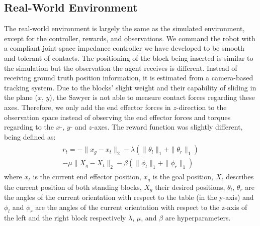 \subsection{Real-World Environment}
The real-world environment is largely the same as the simulated environment, except for the controller, rewards, and observations.
We command the robot with a compliant joint-space impedance controller we have developed to be smooth and tolerant of contacts.
The positioning of the block being inserted is similar to the simulation but the observation the agent receives is different. Instead of receiving ground truth position information, it is estimated from a camera-based tracking system.
Due to the blocks' slight weight and their capability of sliding in the plane ($x$, $y$), the Sawyer is not able to measure contact forces regarding these axes.
Therefore, we only add the end effector forces in $z$-direction to the observation space instead of observing the end effector forces and torques regarding to the $x$-, $y$- and $z$-axes.
The reward function was slightly different, being defined as: 
    \begin{align}
    \begin{split}
    r_t = - \|x_g - x_t \|_2 - \lambda (\|\theta_{l} \|_1 + \|\theta_{r} \|_1) \\ - \mu \|X_g - X_t \|_2 - \beta (\|\phi_{l} \|_1 + \|\phi_{r} \|_1)
    \end{split}
    \end{align}
where $x_t$ is the current end effector position, $x_g$ is the goal position, $X_t$ describes the current position of both standing blocks, $X_g$ their desired positions, $\theta_{l}$, $\theta_{r}$ are the angles of the current orientation with respect to the table (in the y-axis) and $\phi_{l}$ and $\phi_{r}$ are the angles of the current orientation with respect to the z-axis of the left and the right block respectively $\lambda$, $\mu$, and $\beta$ are hyperparameters. 

%


